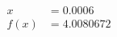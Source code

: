 \documentclass[preview]{standalone}
\begin{document}
\begin{align*}
x &= 0.0006\\f(x) &= 4.0080672
\end{align*}
\end{document}
